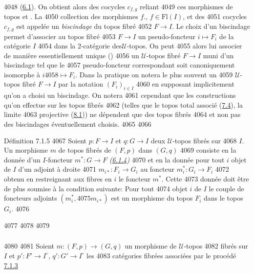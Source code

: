   4048	(\hyperref[VI.def6.1]{6.1}). On obtient alors des cocycles $c_{f, g}$ reliant
  4049	ces morphismes de  topos  et . La
  4050	collection des morphismes $f.$, $f \in \text{Fl}(I)$, et des
  4051	cocycles $c_{f, g}$ est appelée un \emph{biscindage} du topos fibré
  4052	$F \to I$. Le choix d'un biscindage permet d'associer au topos fibré
  4053	$F \to I$ un pseudo-foncteur $i \mapsto F_i$ de la catégorie $I$
  4054	dans la 2-catégorie des\pageoriginale $𝒰$-topos. On peut
  4055	alors lui associer de manière essentiellement unique (\cf \cite{5})
  4056	un $𝒰$-topos fibré $F \to I$ muni d'un biscindage tel que le
  4057	pseudo-foncteur correspondant soit canoniquement isomorphe à $i
  4058	\mapsto F_i$. Dans la pratique on notera le plus souvent un
  4059	$𝒰$-topos fibré $F \to I$ par la notation $(F_i)_{i \in I}$
  4060	en supposant implicitement qu'on a choisi un biscindage. On notera
  4061	cependant que les constructions qu'on effectue sur les topos fibrés
  4062	(telles que le topos total associé (\hyperref[VI.subsec7.4]{7.4}), la limite
  4063	projective (\hyperref[VI.subsec8.1]{8.1})) ne dépendent que des topos fibrés
  4064	et non pas des biscindages éventuellement choisis.
  4065	
  4066	\begin{enonce*}{Définition 7.1.5}
  4067	Soient $p : F \to I$ et $q : G \to I$ deux $𝒰$-topos fibrés sur
  4068	$I$. Un morphisme $m$ de topos fibrés de $(F, p)$ dans $(G, q)$
  4069	consiste en la donnée d'un $I$-foncteur $m^{\ast} : G \to F$ \emph{(\hyperref[VI.subsubsec6.1.4]{6.1.4})}
  4070	et en la donnée pour tout $i$ objet de $I$ d'un adjoint à droite
  4071	$m_{i\ast} : F_i \to G_i$ au foncteur $m^{\ast}_i : G_i \to F_i$
  4072	obtenu en restreignant aux fibres en $i$ le foncteur $m^{\ast}$. Cette
  4073	donnée doit être de plus soumise à la condition suivante: Pour tout
  4074	objet $i$ de $I$ le couple de foncteurs adjoints $(m^{\ast}_i,
  4075	m_{i\ast})$ est un morphisme du topos $F_i$ dans le topos $G_i$.
  4076	\end{enonce*}
  4077	
  4078	\setcounter{subsubsection}{5}
  4079	\subsubsection{}
  4080	
  4081	Soient $m : (F, p) \to (G, q)$ un morphisme de $𝒰$-topos
  4082	fibrés sur $I$ et $p': F' \to I^{\circ}$, $q' : G'\to I^{\circ}$ les
  4083	catégories fibrées associées par le procédé \hyperref[VI.subsubsec7.1.3]{7.1.3}
